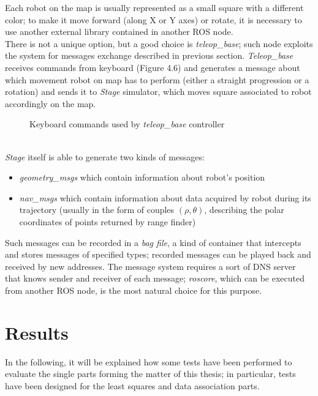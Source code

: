 \documentclass[a4paper, onecolumn]{report}
\begin{document}
Each robot on the map is usually represented as a small square with a different color; to make it move forward (along X or Y axes) or rotate, it is necessary to use another external library contained in another ROS node. \\
There is not a unique option, but a good choice is \emph{teleop\_base}; such node exploits the system for messages exchange described in previous section. \emph{Teleop\_base} receives commands from keyboard (Figure 4.6) and generates a message about which movement robot on map has to perform (either a straight progression or a rotation) and sends it to \emph{Stage} simulator, which moves square associated to robot accordingly on the map.
\begin{figure}[htbp]
\centering
{}
\caption{Keyboard commands used by \emph{teleop\_base} controller}
\end{figure}\\
\emph{Stage} itself is able to generate two kinds of messages:
\begin{itemize}
	\item{\emph{geometry\_msgs} which contain information about robot's position}
	\item{\emph{nav\_msgs} which contain information about data acquired by robot during its trajectory (usually in the form of couples $(\rho, \theta)$, describing the polar coordinates of points returned by range finder)}  
\end{itemize}
Such messages can be recorded in a \emph{bag file}, a kind of container that intercepts and stores messages of specified types; recorded messages can be played back and received by new addresses. The message system requires a sort of DNS server that knows sender and receiver of each message; \emph{roscore}, which can be executed from another ROS node, is the most natural choice for this purpose.

\section{Results}
In the following, it will be explained how some tests have been performed to evaluate the single parts forming the matter of this thesis; in particular, tests have been designed for the least squares and data association parts.
\end{document}
